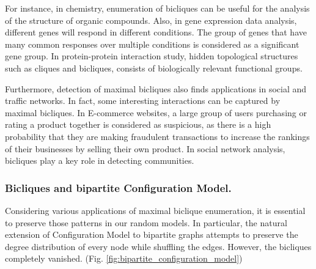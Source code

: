 \documentclass[table]{report}
\begin{document}
\medbreak
For instance, in chemistry, enumeration of bicliques can be useful for the analysis of the structure of organic compounds. Also, in gene expression data analysis, different genes will respond in different conditions. The group of genes that have many common responses over multiple conditions is considered as a significant gene group. In protein-protein interaction study, hidden topological structures such as cliques and bicliques, consists of biologically relevant functional groups.


Furthermore, detection of maximal bicliques also finds applications in social and traffic networks. In fact, some interesting interactions can be captured by maximal bicliques. In E-commerce websites, a large group of users purchasing or rating a product together is considered as suspicious, as there is a high probability that they are making fraudulent transactions to increase the
rankings of their businesses by selling their own product.  In social network analysis, bicliques play a key role in detecting communities.


\medbreak

\subsubsection{Bicliques and bipartite Configuration Model. }
Considering various applications of maximal biclique enumeration, it is essential to preserve those patterns in our random models. In particular, the natural extension of Configuration Model to bipartite graphs attempts to preserve the degree distribution of every node while shuffling the edges. However, the bicliques completely vanished.  (Fig. \ref{fig:bipartite_configuration_model})

%
%
%
%
%
\end{document}

